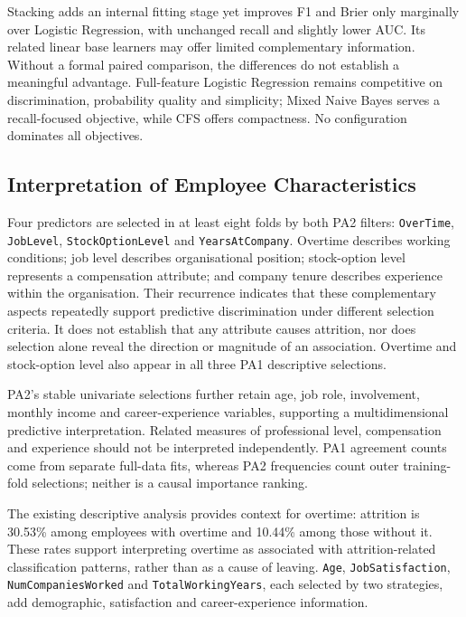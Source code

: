 Stacking adds an internal fitting stage yet improves F1 and Brier only marginally over Logistic Regression, with unchanged recall and slightly lower AUC. Its related linear base learners may offer limited complementary information. Without a formal paired comparison, the differences do not establish a meaningful advantage. Full-feature Logistic Regression remains competitive on discrimination, probability quality and simplicity; Mixed Naive Bayes serves a recall-focused objective, while CFS offers compactness. No configuration dominates all objectives.

\subsection{Interpretation of Employee Characteristics}
Four predictors are selected in at least eight folds by both PA2 filters: \texttt{OverTime}, \texttt{JobLevel}, \texttt{StockOptionLevel} and \texttt{YearsAtCompany}. Overtime describes working conditions; job level describes organisational position; stock-option level represents a compensation attribute; and company tenure describes experience within the organisation. Their recurrence indicates that these complementary aspects repeatedly support predictive discrimination under different selection criteria. It does not establish that any attribute causes attrition, nor does selection alone reveal the direction or magnitude of an association. Overtime and stock-option level also appear in all three PA1 descriptive selections.

PA2's stable univariate selections further retain age, job role, involvement, monthly income and career-experience variables, supporting a multidimensional predictive interpretation. Related measures of professional level, compensation and experience should not be interpreted independently. PA1 agreement counts come from separate full-data fits, whereas PA2 frequencies count outer training-fold selections; neither is a causal importance ranking.

The existing descriptive analysis provides context for overtime: attrition is 30.53\% among employees with overtime and 10.44\% among those without it. These rates support interpreting overtime as associated with attrition-related classification patterns, rather than as a cause of leaving. \texttt{Age}, \texttt{JobSatisfaction}, \texttt{NumCompaniesWorked} and \texttt{TotalWorkingYears}, each selected by two strategies, add demographic, satisfaction and career-experience information.

